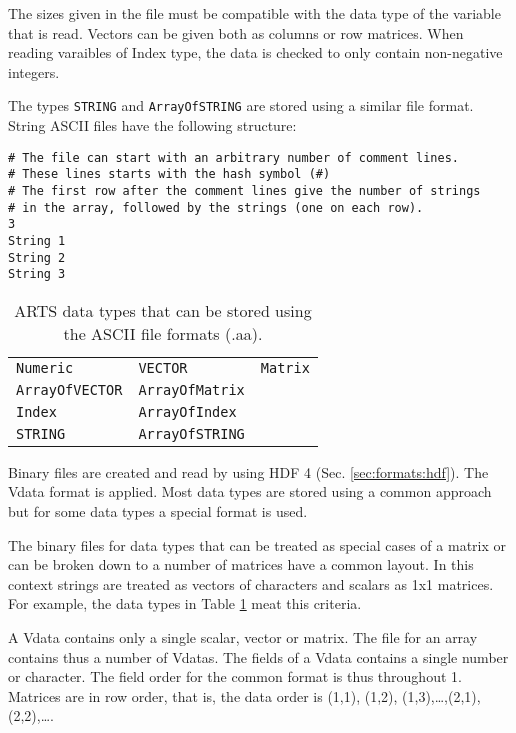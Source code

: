  The sizes given in the file must be compatible with the data type
 of the variable that is read. Vectors can be given both as
 columns or row matrices. When reading varaibles of Index type,
 the data is checked to only contain non-negative integers.
 
 The types \verb|STRING| and \verb|ArrayOfSTRING| are stored using a
 similar file format. String ASCII files have the following structure:
 {\footnotesize \begin{verbatim} 
# The file can start with an arbitrary number of comment lines.
# These lines starts with the hash symbol (#)
# The first row after the comment lines give the number of strings
# in the array, followed by the strings (one on each row).  
3
String 1
String 2
String 3
 \end{verbatim} 
}

 \begin{table}[t]
  \begin{tabular}{p{4.5cm} p{4.5cm} p{4.5cm}}
   \verb|Numeric|        & \verb|VECTOR|         & \verb|Matrix|          \\
   \verb|ArrayOfVECTOR|  & \verb|ArrayOfMatrix|  &                        \\
   \verb|Index|          & \verb|ArrayOfIndex|  &                        \\
   \verb|STRING|          & \verb|ArrayOfSTRING|  &                        \\
  \end{tabular}
  \caption{ARTS data types that can be stored using the ASCII
           file formats (.aa).}
  \label{table:format:aa}
 \end{table}
 

 \label{sec:formats:file:binary}
  
 Binary files are created and read by using HDF 4 (Sec.
 \ref{sec:formats:hdf}). The Vdata format is applied. Most data types
 are stored using a common approach but for some data types a special 
 format is used.

 \label{sec:formats:file:binary:general}
 
 The binary files for data types that can be treated as special cases
 of a matrix or can be broken down to a number of matrices have a
 common layout. In this context strings are treated as vectors of
 characters and scalars as 1x1 matrices. For example, the data types
 in Table \ref{table:format:aa} meat this criteria.
 
 A Vdata contains only a single scalar, vector or matrix. The file for
 an array contains thus a number of Vdatas. The fields of a Vdata
 contains a single number or character. The field order for the common
 format is thus throughout 1. Matrices are in row order, that is, 
 the data order is (1,1), (1,2), (1,3),\dots,(2,1),(2,2),\dots.
 

